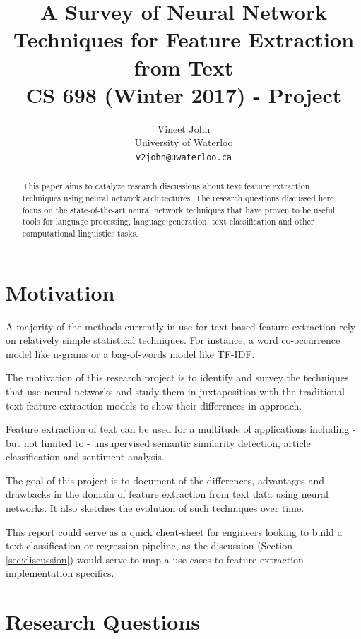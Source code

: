 \documentclass[11pt,a4paper]{article}
\title{A Survey of Neural Network Techniques for Feature Extraction from Text\\ \large CS 698 (Winter 2017) - Project}
\author{
  Vineet John \\
  University of Waterloo \\
  {\tt v2john@uwaterloo.ca} \\
}
\date{}
\begin{document}
\maketitle


\begin{abstract}
  This paper aims to catalyze research discussions about text feature extraction techniques using neural network architectures.
  The research questions discussed here focus on the state-of-the-art neural network techniques that have proven to be useful tools for language processing, language generation, text classification and other computational linguistics tasks.
\end{abstract}

\section{Motivation} %
\label{sec:motivation}

  A majority of the methods currently in use for text-based feature extraction rely on relatively simple statistical techniques. For instance, a word co-occurrence model like n-grams or a bag-of-words model like TF-IDF.

  The motivation of this research project is to identify and survey the techniques that use neural networks and study them in juxtaposition with the traditional text feature extraction models to show their differences in approach.

  Feature extraction of text can be used for a multitude of applications including - but not limited to - unsupervised semantic similarity detection, article classification and sentiment analysis.

  The goal of this project is to document of the differences, advantages and drawbacks in the domain of feature extraction from text data using neural networks. It also sketches the evolution of such techniques over time.

  This report could serve as a quick cheat-sheet for engineers looking to build a text classification or regression pipeline, as the discussion (Section \ref{sec:discussion}) would serve to map a use-cases to feature extraction implementation specifics.


\section{Research Questions} %
\label{sec:research_questions}
\end{document}
